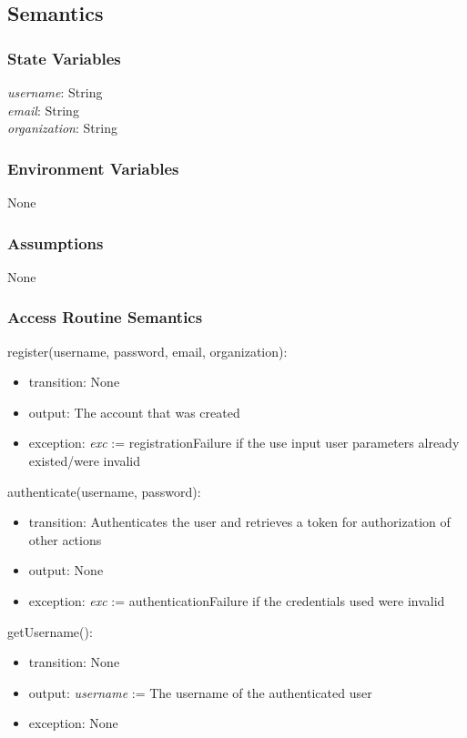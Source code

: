 \documentclass[12pt, titlepage]{article}
\begin{document}
\subsection{Semantics}

\subsubsection{State Variables}

\textit{username}: String \\
\textit{email}: String \\
\textit{organization}: String \\

\subsubsection{Environment Variables}

None

\subsubsection{Assumptions}

None

\subsubsection{Access Routine Semantics}

\noindent register(username, password, email, organization):
\begin{itemize}
\item transition: None
\item output: The account that was created
\item exception: \textit{exc} := registrationFailure if the use input user parameters already existed/were invalid
\end{itemize}

\noindent authenticate(username, password):
\begin{itemize}
\item transition: Authenticates the user and retrieves a token for authorization of other actions 
\item output: None
\item exception: \textit{exc} := authenticationFailure if the credentials used were invalid
\end{itemize}

\noindent getUsername():
\begin{itemize}
\item transition: None
\item output: \textit{username} := The username of the authenticated user
\item exception: None
\end{itemize}
\end{document}
